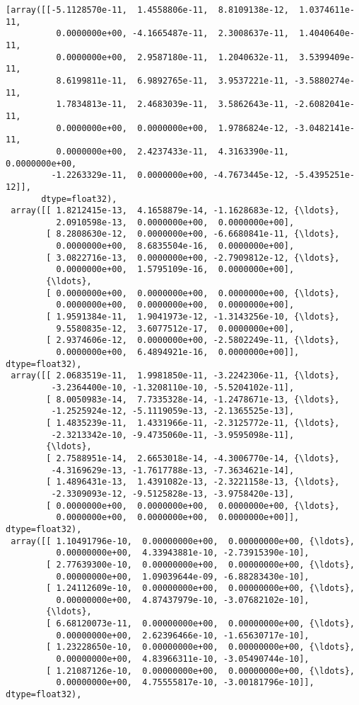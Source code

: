\documentclass[11pt]{article}
\makeatletter
\newcommand{\boxspacing}{\kern\kvtcb@left@rule\kern\kvtcb@boxsep}
\newcommand{\prompt}[4]{
        \ttfamily\llap{{\color{#2}[#3]:\hspace{3pt}#4}}\vspace{-\baselineskip}
    }
\makeatother
\begin{document}
            \begin{tcolorbox}[breakable, size=fbox, boxrule=.5pt, pad at break*=1mm, opacityfill=0]
\prompt{Out}{outcolor}{45}{\boxspacing}
\begin{Verbatim}[commandchars=\\\{\}]
[array([[-5.1128570e-11,  1.4558806e-11,  8.8109138e-12,  1.0374611e-11,
          0.0000000e+00, -4.1665487e-11,  2.3008637e-11,  1.4040640e-11,
          0.0000000e+00,  2.9587180e-11,  1.2040632e-11,  3.5399409e-11,
          8.6199811e-11,  6.9892765e-11,  3.9537221e-11, -3.5880274e-11,
          1.7834813e-11,  2.4683039e-11,  3.5862643e-11, -2.6082041e-11,
          0.0000000e+00,  0.0000000e+00,  1.9786824e-12, -3.0482141e-11,
          0.0000000e+00,  2.4237433e-11,  4.3163390e-11,  0.0000000e+00,
         -1.2263329e-11,  0.0000000e+00, -4.7673445e-12, -5.4395251e-12]],
       dtype=float32),
 array([[ 1.8212415e-13,  4.1658879e-14, -1.1628683e-12, {\ldots},
          2.0910598e-13,  0.0000000e+00,  0.0000000e+00],
        [ 8.2808630e-12,  0.0000000e+00, -6.6680841e-11, {\ldots},
          0.0000000e+00,  8.6835504e-16,  0.0000000e+00],
        [ 3.0822716e-13,  0.0000000e+00, -2.7909812e-12, {\ldots},
          0.0000000e+00,  1.5795109e-16,  0.0000000e+00],
        {\ldots},
        [ 0.0000000e+00,  0.0000000e+00,  0.0000000e+00, {\ldots},
          0.0000000e+00,  0.0000000e+00,  0.0000000e+00],
        [ 1.9591384e-11,  1.9041973e-12, -1.3143256e-10, {\ldots},
          9.5580835e-12,  3.6077512e-17,  0.0000000e+00],
        [ 2.9374606e-12,  0.0000000e+00, -2.5802249e-11, {\ldots},
          0.0000000e+00,  6.4894921e-16,  0.0000000e+00]], dtype=float32),
 array([[ 2.0683519e-11,  1.9981850e-11, -3.2242306e-11, {\ldots},
         -3.2364400e-10, -1.3208110e-10, -5.5204102e-11],
        [ 8.0050983e-14,  7.7335328e-14, -1.2478671e-13, {\ldots},
         -1.2525924e-12, -5.1119059e-13, -2.1365525e-13],
        [ 1.4835239e-11,  1.4331966e-11, -2.3125772e-11, {\ldots},
         -2.3213342e-10, -9.4735060e-11, -3.9595098e-11],
        {\ldots},
        [ 2.7588951e-14,  2.6653018e-14, -4.3006770e-14, {\ldots},
         -4.3169629e-13, -1.7617788e-13, -7.3634621e-14],
        [ 1.4896431e-13,  1.4391082e-13, -2.3221158e-13, {\ldots},
         -2.3309093e-12, -9.5125828e-13, -3.9758420e-13],
        [ 0.0000000e+00,  0.0000000e+00,  0.0000000e+00, {\ldots},
          0.0000000e+00,  0.0000000e+00,  0.0000000e+00]], dtype=float32),
 array([[ 1.10491796e-10,  0.00000000e+00,  0.00000000e+00, {\ldots},
          0.00000000e+00,  4.33943881e-10, -2.73915390e-10],
        [ 2.77639300e-10,  0.00000000e+00,  0.00000000e+00, {\ldots},
          0.00000000e+00,  1.09039644e-09, -6.88283430e-10],
        [ 1.24112609e-10,  0.00000000e+00,  0.00000000e+00, {\ldots},
          0.00000000e+00,  4.87437979e-10, -3.07682102e-10],
        {\ldots},
        [ 6.68120073e-11,  0.00000000e+00,  0.00000000e+00, {\ldots},
          0.00000000e+00,  2.62396466e-10, -1.65630717e-10],
        [ 1.23228650e-10,  0.00000000e+00,  0.00000000e+00, {\ldots},
          0.00000000e+00,  4.83966311e-10, -3.05490744e-10],
        [ 1.21087126e-10,  0.00000000e+00,  0.00000000e+00, {\ldots},
          0.00000000e+00,  4.75555817e-10, -3.00181796e-10]], dtype=float32),



\end{Verbatim}
\end{tcolorbox}
\end{document}

